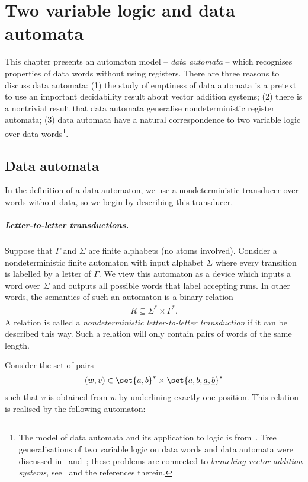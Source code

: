  \chapter{Two variable logic and data automata}
This chapter presents an automaton model -- \emph{data automata} -- which recognises properties of data words without using registers. There are three reasons to discuss data automata: (1) the study of emptiness of data automata is a pretext to use an important decidability result about vector addition systems; (2) there is a nontrivial result that data automata generalise nondeterministic register automata; (3) data automata have a natural correspondence to two variable logic over data words\footnote{The model of data automata and its application to logic is from~\cite{bojanczyk_two-variable_2011}. Tree generalisations of two variable logic on data words and data automata were discussed in~\cite{DBLP:journals/jacm/BojanczykMSS09} and~\cite{DBLP:journals/corr/JacquemardSD16}; 
these problems are connected to \emph{branching vector addition systems}, see~\cite{DBLP:conf/icalp/GollerHLT16} and the references therein.}.

\section{Data automata}
In the definition of a data automaton, we use a nondeterministic transducer over words without data, so we begin by describing this transducer.
\paragraph*{Letter-to-letter transductions.} Suppose that $\Gamma$ and $\Sigma$ are finite alphabets (no atoms involved). 
Consider a nondeterministic finite automaton with input alphabet $\Sigma$ where every transition is labelled by a letter of $\Gamma$. We view this automaton as a device which inputs a word over $\Sigma$ and outputs all possible words that label accepting runs. In other words, the semantics of such an automaton is a binary relation 
\begin{align*}
	R \subseteq \Sigma^* \times \Gamma^*. 
 \end{align*}
 A relation 
is called a \emph{nondeterministic letter-to-letter transduction} if it can be described this way. Such a relation will only contain pairs of words of the same length.


\begin{myexample}\label{ex:underliner}
Consider the set of pairs
\begin{align*}
(w,v) \in \set{a,b}^* \times \set{a,b,\underline a,\underline b}^*
\end{align*}
such that $v$ is obtained from $w$ by underlining exactly one position. This relation is realised by the following automaton: 	
\end{myexample}



